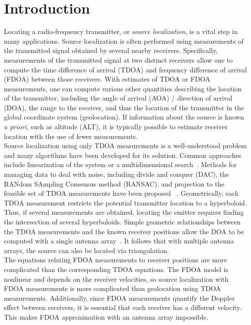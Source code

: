 \section{Introduction}
\label{s:intro}
Locating a radio-frequency transmitter, or \emph{source localization}, is a vital step in many applications. Source localization is often performed using measurements of the transmitted signal obtained by several nearby receivers. Specifically, measurements of the transmitted signal at two distinct receivers allow one to compute the time difference of arrival (TDOA) and frequency difference of arrival (FDOA) between those receivers. With estimates of TDOA or FDOA measurements, one can compute various other quantities describing the location of the transmitter, including the angle of arrival (AOA) / direction of arrival (DOA), the range to the receiver, and thus the location of the transmitter in the global coordinate system (geolocation). If information about the source is known {\em a priori}, such as altitude (ALT), it is typically possible to estimate receiver location with the use of fewer measurements.\\

Source localization using only TDOA measurements is a well-understood problem and many algorithms have been developed for its solution. Common approaches include linearization of the system or a multidimensional search~\cite{Torrieri1984}. Methods for managing data to deal with noise, including divide and conquer (DAC), the RANdom SAmpling Consensus method (RANSAC), and projection to the feasible set of TDOA measurements have been proposed ~\cite{Cameron,Abel1990,Li2009,Compagnoni2017}. Geometrically, each TDOA measurement restricts the potential transmitter location to a hyperboloid. Thus, if several measurements are obtained, locating the emitter requires finding the intersection of several hyperboloids. Simple geometric relationships between the TDOA measurements and the known receiver positions allow the DOA to be computed with a single antenna array~\cite{Benesty2008}. It follows that with multiple antenna arrays, the source can also be located via triangulation. \\

The equations relating FDOA measurements to receiver positions are more complicated than the corresponding TDOA equations. The FDOA model is nonlinear and depends on the receiver velocities, so source localization with FDOA measurements is more complicated than geolocation using TDOA measurements. Additionally, since FDOA measurements quantify the Doppler effect between receivers, it is essential that each receiver has a different velocity. This makes FDOA approximation with an antenna array impossible. \\

